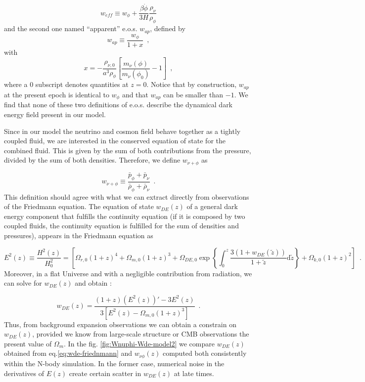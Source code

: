 \begin{equation}
w_{eff}\equiv w_{\phi}+\frac{\beta\dot{\phi}}{3H}\frac{\rho_{\nu}}{\rho_{\phi}}
\end{equation}
and the second one named ``apparent'' e.o.s. $w_{ap}$, defined
by 
\begin{equation}
w_{ap}\equiv\frac{w_{\phi}}{1+x}\,\,\,,
\end{equation}
with 
\begin{equation}
x=-\frac{\rho_{\nu,0}}{a^{3}\rho_{\phi}}\left[\frac{m_{\nu}(\phi)}{m_{\nu}(\phi_{0})}-1\right]\,\,\,,
\end{equation}
where a $0$ subscript denotes quantities at $z=0$. Notice that by
construction, $w_{ap}$ at the present epoch is identical to $w_{\phi}$
and that $w_{ap}$ can be smaller than $-1$. We find that none of
these two definitions of e.o.s. describe the dynamical dark energy
field present in our model.

Since in our model the neutrino and cosmon field behave together as
a tightly coupled fluid, we are interested in the conserved equation
of state for the combined fluid. This is given by the sum of both
contributions from the pressure, divided by the sum of both densities.
Therefore, we define $w_{\nu+\phi}$ as

\begin{equation}
w_{\nu+\phi}\equiv\frac{\bar{p}_{\phi}+\bar{p}_{\nu}}{\bar{\rho}_{\phi}+\bar{\rho}_{\nu}}\,\,\,.\label{eq:Wqnu-1}
\end{equation}
This definition should agree with what we can extract directly from
observations of the Friedmann equation. The equation of state $w_{DE}(z)$
of a general dark energy component that fulfills the continuity equation
(if it is composed by two coupled fluids, the continuity equation
is fulfilled for the sum of densities and pressures), appears in the
Friedmann equation as

\begin{equation}
E^{2}(z)\equiv\frac{H^{2}(z)}{H_{0}^{2}}=\left[\Omega_{r,0}(1+z)^{4}+\Omega_{m,0}(1+z)^{3}+\Omega_{DE,0}\exp\left\{ \int_{0}^{z}\frac{3(1+w_{DE}(\tilde{z}))}{1+\tilde{z}}\mbox{d}\tilde{z}\right\} +\Omega_{k,0}(1+z)^{2}\right]\,\,\,.
\end{equation}
Moreover, in a flat Universe and with a negligible contribution from
radiation, we can solve for $w_{DE}(z)$ and obtain \cite{amendola_dark_2010}:

\begin{equation}
w_{DE}(z)=\frac{(1+z)(E^{2}(z))'-3E^{2}(z)}{3\left[E^{2}(z)-\Omega_{m,0}(1+z)^{3}\right]}\,\,\,.\label{eq:wde-friednmann}
\end{equation}
Thus, from background expansion observations we can obtain a constrain
on $w_{DE}(z)$, provided we know from large-scale structure or CMB
observations the present value of $\Omega_{m}$. In the fig. \ref{fig:Wnuphi-Wde-model2}
we compare $w_{DE}(z)$ obtained from eq.\ref{eq:wde-friednmann}
and $w_{\nu\phi}(z)$ computed both consistently within the N-body
simulation. In the former case, numerical noise in the derivatives
of $E(z)$ create certain scatter in $w_{DE}(z)$ at late times.

